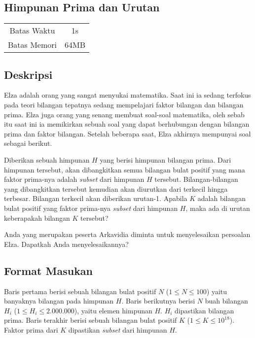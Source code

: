 \documentclass{article}
\begin{document}
\begin{center}
    \section*{Himpunan Prima dan Urutan} %

    \begin{tabular}{ | c c | }
        \hline
        Batas Waktu  & 1s \\    %
        Batas Memori & 64MB \\  %
        \hline
    \end{tabular}
\end{center}

\subsection*{Deskripsi}

Elza adalah orang yang sangat menyukai matematika. Saat ini ia sedang terfokus pada teori bilangan tepatnya 
sedang mempelajari faktor bilangan dan bilangan prima. Elza juga orang yang senang membuat soal-soal matematika, 
oleh sebab itu saat ini ia memikirkan sebuah soal yang dapat berhubungan dengan bilangan prima dan faktor bilangan. 
Setelah beberapa saat, Elza akhirnya mempunyai soal sebagai berikut.

Diberikan sebuah himpunan $H$ yang berisi himpunan bilangan prima. Dari himpunan tersebut, akan dibangkitkan 
semua bilangan bulat positif yang mana faktor prima-nya adalah \textit{subset} dari himpunan $H$ tersebut. 
Bilangan-bilangan yang dibangkitkan tersebut kemudian akan diurutkan dari terkecil hingga terbesar. Bilangan 
terkecil akan diberikan urutan-1. Apabila $K$ adalah bilangan bulat positif yang faktor prima-nya \textit{subset}
dari himpunan $H$, maka ada di urutan keberapakah bilangan $K$ tersebut?

Anda yang merupakan peserta Arkavidia diminta untuk menyelesaikan persoalan Elza. Dapatkah Anda menyelesaikannya?

\subsection*{Format Masukan}
Baris pertama berisi sebuah bilangan bulat positif $N$ ($1 \leq N \leq 100$) yaitu banyaknya bilangan pada
himpunan $H$. Baris berikutnya berisi $N$ buah bilangan $H_i$ ($1 \leq H_i \leq 2.000.000$), yaitu elemen himpunan $H$. $H_i$ dipastikan
bilangan prima. Baris terakhir berisi sebuah bilangan bulat positif $K$ ($1 \leq K \leq 10^{18}$). Faktor prima dari $K$ dipastikan
\textit{subset} dari himpunan $H$.
\end{document}

